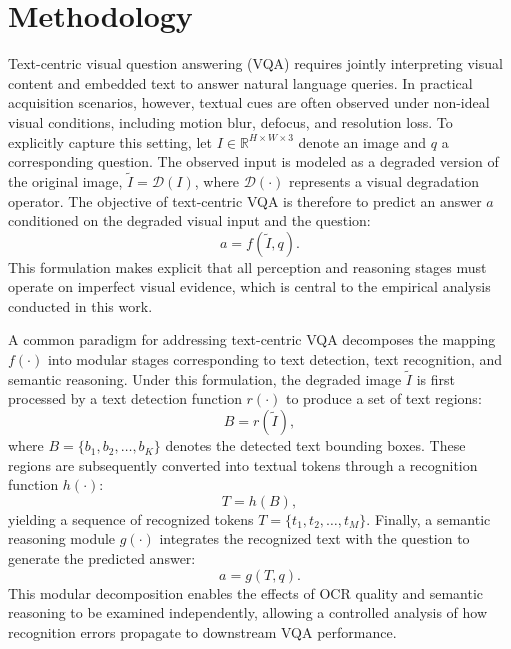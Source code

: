 \documentclass[conference]{IEEEtran}
\begin{document}
\section{Methodology}

Text-centric visual question answering (VQA) requires jointly interpreting visual content and embedded text to answer natural language queries. In practical acquisition scenarios, however, textual cues are often observed under non-ideal visual conditions, including motion blur, defocus, and resolution loss. To explicitly capture this setting, let $I \in \mathbb{R}^{H \times W \times 3}$ denote an image and $q$ a corresponding question. The observed input is modeled as a degraded version of the original image, $\tilde{I} = \mathcal{D}(I)$, where $\mathcal{D}(\cdot)$ represents a visual degradation operator. The objective of text-centric VQA is therefore to predict an answer $a$ conditioned on the degraded visual input and the question:
\begin{equation}
a = f(\tilde{I}, q).
\end{equation}
This formulation makes explicit that all perception and reasoning stages must operate on imperfect visual evidence, which is central to the empirical analysis conducted in this work.

A common paradigm for addressing text-centric VQA decomposes the mapping $f(\cdot)$ into modular stages corresponding to text detection, text recognition, and semantic reasoning. Under this formulation, the degraded image $\tilde{I}$ is first processed by a text detection function $r(\cdot)$ to produce a set of text regions:
\begin{equation}
B = r(\tilde{I}),
\end{equation}
where $B = \{b_1, b_2, \dots, b_K\}$ denotes the detected text bounding boxes. These regions are subsequently converted into textual tokens through a recognition function $h(\cdot)$:
\begin{equation}
T = h(B),
\end{equation}
yielding a sequence of recognized tokens $T = \{t_1, t_2, \dots, t_M\}$. Finally, a semantic reasoning module $g(\cdot)$ integrates the recognized text with the question to generate the predicted answer:
\begin{equation}
a = g(T, q).
\end{equation}
This modular decomposition enables the effects of OCR quality and semantic reasoning to be examined independently, allowing a controlled analysis of how recognition errors propagate to downstream VQA performance.
\end{document}
